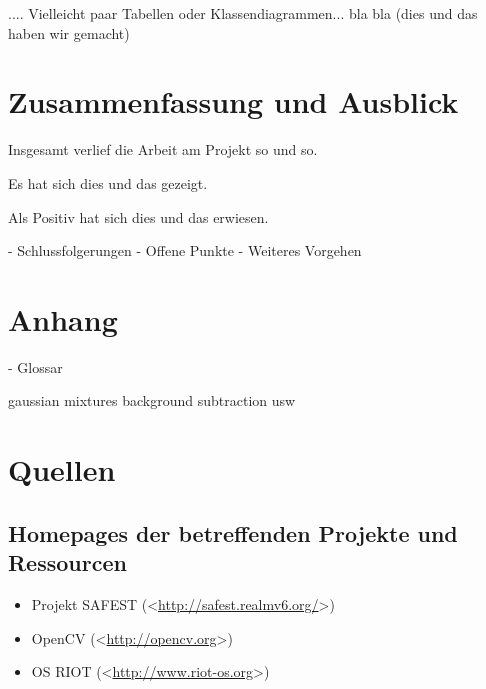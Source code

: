 \documentclass[10pt,a4paper]{article}
\begin{document}
.... Vielleicht paar Tabellen oder Klassendiagrammen...  bla bla
(dies und das haben wir gemacht)

\newpage
\section{Zusammenfassung und Ausblick}

Insgesamt verlief die Arbeit am Projekt so und so.

Es hat sich dies und das gezeigt.

Als Positiv hat sich dies und das erwiesen.

- Schlussfolgerungen
- Offene Punkte
- Weiteres Vorgehen

\newpage
\section{Anhang}

- Glossar

gaussian mixtures
background subtraction usw


\newpage
\section{Quellen}

\subsection*{Homepages der betreffenden Projekte und Ressourcen}
\begin{itemize}
\item Projekt SAFEST (\textless\href{http://safest.realmv6.org/}{http://safest.realmv6.org/}\textgreater)
\item OpenCV (\textless\href{http://opencv.org}{http://opencv.org}\textgreater)
\item OS RIOT (\textless\href{http://www.riot-os.org}{http://www.riot-os.org}\textgreater)
\end{itemize}
\end{document}
